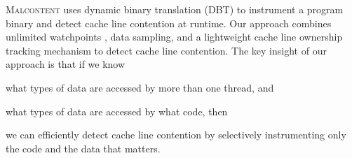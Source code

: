 \documentclass[letterpaper,twocolumn,10pt]{article}
\newcommand{\TextToolname}{Malcontent}
\newcommand{\Toolname}{\textsc{\TextToolname{}}}
\begin{document}
\Toolname{} uses dynamic binary translation (DBT) to instrument a program binary and detect cache line contention
at runtime. Our approach combines unlimited watchpoints \cite{UnlimitedWatchpoints,DynamoRIOWatchpoints}, data
sampling, and a lightweight cache line ownership tracking mechanism to detect cache line contention. The key insight
of our approach is that if we know \begin{inparaenum}[i)]
\item what types of data are accessed by more than one thread, and
\item what types of data are accessed by what code, then
\end{inparaenum}
we can efficiently detect cache line contention by selectively instrumenting only the code and the data that matters.




\end{document}
